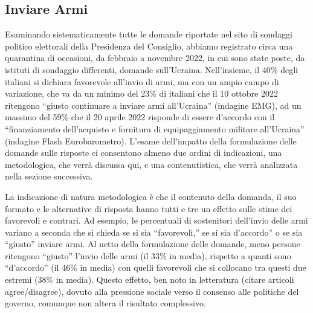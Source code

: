 \documentclass[
]{book}
\begin{document}
\hypertarget{inviare-armi}{%
\subsection{Inviare Armi}\label{inviare-armi}}

Esaminando sistematicamente tutte le domande riportate nel sito di sondaggi politico elettorali della Presidenza del Consiglio, abbiamo registrato circa una quarantina di occasioni, da febbraio a novembre 2022, in cui sono state poste, da istituti di sondaggio differenti, domande sull'Ucraina. Nell'insieme, il 40\% degli italiani si dichiara favorevole all'invio di armi, ma con un ampio campo di variazione, che va da un minimo del 23\% di italiani che il 10 ottobre 2022 ritengono ``giusto continuare a inviare armi all'Ucraina'' (indagine EMG), ad un massimo del 59\% che il 20 aprile 2022 risponde di essere d'accordo con il ``finanziamento dell'acquisto e fornitura di equipaggiamento militare all'Ucraina'' (indagine Flash Eurobarometro). L'esame dell'impatto della formulazione delle domande sulle risposte ci consentono almeno due ordini di indicazioni, una metodologica, che verrà discussa qui, e una contenutistica, che verrà analizzata nella sezione successiva.

La indicazione di natura metodologica è che il contenuto della domanda, il suo formato e le alternative di risposta hanno tutti e tre un effetto sulle stime dei favorevoli e contrari. Ad esempio, le percentuali di sostenitori dell'invio delle armi variano a seconda che si chieda se si sia ``favorevoli,'' se si sia d'accordo'' o se sia ``giusto'' inviare armi. Al netto della formulazione delle domande, meno persone ritengono ``giusto'' l'invio delle armi (il 33\% in media), rispetto a quanti sono ``d'accordo'' (il 46\% in media) con quelli favorevoli che si collocano tra questi due estremi (38\% in media). Questo effetto, ben noto in letteratura (citare articoli agree/disagree), dovuto alla pressione sociale verso il consenso alle politiche del governo, comunque non altera il risultato complessivo.
\end{document}

